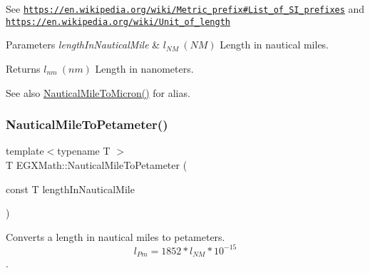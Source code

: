 See \href{https://en.wikipedia.org/wiki/Metric_prefix#List_of_SI_prefixes}{\tt https\+://en.\+wikipedia.\+org/wiki/\+Metric\+\_\+prefix\#\+List\+\_\+of\+\_\+\+S\+I\+\_\+prefixes} and \href{https://en.wikipedia.org/wiki/Unit_of_length}{\tt https\+://en.\+wikipedia.\+org/wiki/\+Unit\+\_\+of\+\_\+length} 
\begin{DoxyParams}{Parameters}
{\em length\+In\+Nautical\+Mile} & $ l_{NM}\ (NM)$ Length in nautical miles. \\
\hline
\end{DoxyParams}
\begin{DoxyReturn}{Returns}
$ l_{nm}\ (nm)$ Length in nanometers. 
\end{DoxyReturn}
\begin{DoxySeeAlso}{See also}
\mbox{\hyperlink{group___e_g_x_math-_conversions-_length_conversions-_non-_s_i-_nautical_mile-_non-_s_i_gad80a4f8f82660ad19a420e55bfb33447}{Nautical\+Mile\+To\+Micron()}} for alias. 
\end{DoxySeeAlso}
\mbox{\label{group___e_g_x_math-_conversions-_length_conversions-_non-_s_i-_nautical_mile-_s_i_ga89c2423e9ccfe76f9a9137060ac23e8d}} 
\subsubsection{\texorpdfstring{Nautical\+Mile\+To\+Petameter()}{NauticalMileToPetameter()}}
{\footnotesize\ttfamily template$<$typename T $>$ \\
T E\+G\+X\+Math\+::\+Nautical\+Mile\+To\+Petameter (\begin{DoxyParamCaption}\item[{const T}]{length\+In\+Nautical\+Mile }\end{DoxyParamCaption})}



Converts a length in nautical miles to petameters. \[ l_{Pm}=1852 * l_{NM} * 10^{-15} \]. 

